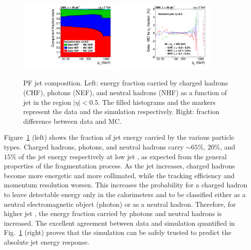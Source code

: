 \begin{figure}[ht!]
  \begin{center}
    \includegraphics[width=0.45\textwidth]{Figures/JEC/jecChecks_fracstack_Rap0}
    \includegraphics[width=0.45\textwidth]{Figures/JEC/jecChecks_fracDataMinusMC_Rap0.pdf}
    \caption{PF jet composition. Left: energy fraction carried by charged hadrons (CHF), photons (NEF), and neutral hadrons (NHF) as a function of jet \pt in the region $|\eta|<0.5$. The filled histograms and the markers represent the data and the simulation respectively. Right: \pt fraction difference between data and MC.}
    \label{fig:composition}
  \end{center}
\end{figure}

Figure~\ref{fig:composition} (left) shows the fraction of jet energy carried by the various particle types. Charged hadrons, photons, and neutral hadrons carry $\sim 65\%,\,20\%$, and $15\%$ of the jet energy respectively at low jet \pt, as expected from the general properties of the fragmentation process. As the jet \pt increases, charged hadrons become more energetic and more collimated, while the tracking efficiency and momentum resolution worsen. This increases the probability for a charged hadron to leave detectable energy only in the calorimeters and to be classified either as a neutral electromagnetic object (photon) or as a neutral hadron. Therefore, for higher jet \pt, the energy fraction carried by photons and neutral hadrons is increased. The excellent agreement between data and simulation quantified in Fig.~\ref{fig:composition} (right) proves that the simulation can be safely trusted to predict the absolute jet energy response. 


